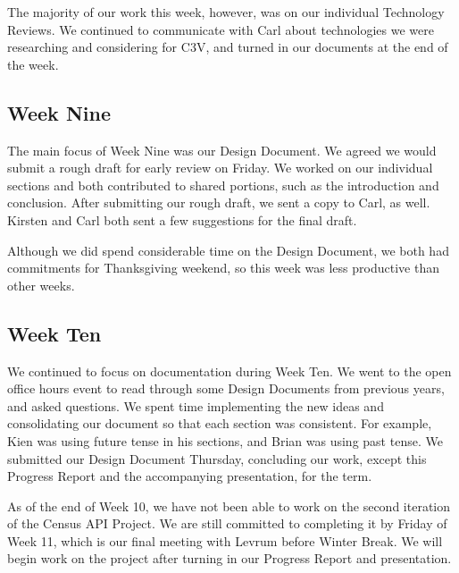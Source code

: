 \documentclass[onecolumn, draftclsnofoot,10pt, compsoc]{IEEEtran}
\begin{document}
\begin{singlespace}
The majority of our work this week, however, was on our individual Technology Reviews.
We continued to communicate with Carl about technologies we were researching and considering for C3V, and turned in our documents at the end of the week.

\subsection{Week Nine}
The main focus of Week Nine was our Design Document.
We agreed we would submit a rough draft for early review on Friday.
We worked on our individual sections and both contributed to shared portions, such as the introduction and conclusion.
After submitting our rough draft, we sent a copy to Carl, as well.
Kirsten and Carl both sent a few suggestions for the final draft.

Although we did spend considerable time on the Design Document, we both had commitments for Thanksgiving weekend, so this week was less productive than other weeks.

\subsection{Week Ten}
We continued to focus on documentation during Week Ten. We went to the open office hours event to read through some Design Documents from previous years, and asked questions.
We spent time implementing the new ideas and consolidating our document so that each section was consistent.
For example, Kien was using future tense in his sections, and Brian was using past tense.
We submitted our Design Document Thursday, concluding our work, except this Progress Report and the accompanying presentation, for the term.

As of the end of Week 10, we have not been able to work on the second iteration of the Census API Project. 
We are still committed to completing it by Friday of Week 11, which is our final meeting with Levrum before Winter Break.
We will begin work on the project after turning in our Progress Report and presentation.
\end{singlespace}
\end{document}
